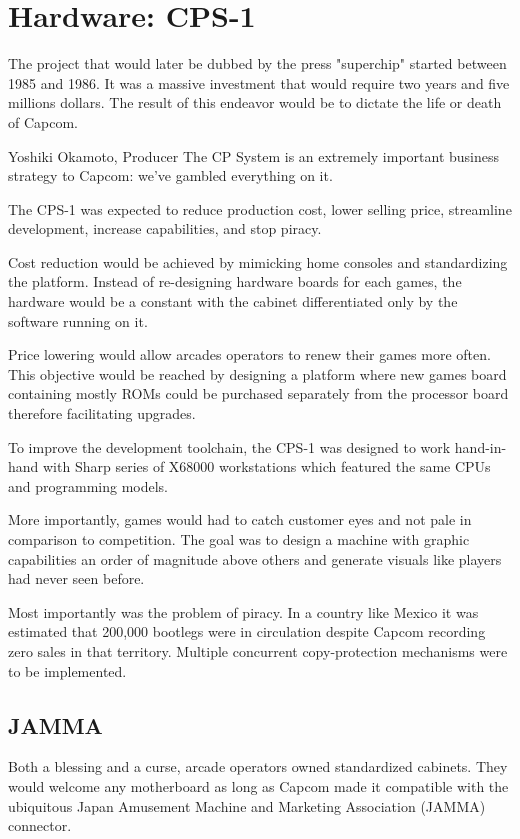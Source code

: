 \chapter{Hardware: CPS-1}

The project that would later be dubbed by the press "superchip"\cite{tgm198906} started between 1985 and 1986. It was a massive investment that would require two years and five millions dollars. The result of this endeavor would be to dictate the life or death of Capcom.

\begin{q}{Yoshiki Okamoto, Producer\cite{gamest38}}
The CP System is an extremely important business strategy to Capcom: we’ve gambled everything on it.
\end{q}

The CPS-1 was expected to reduce production cost, lower selling price, streamline development, increase capabilities, and stop piracy. 

Cost reduction would be achieved by mimicking home consoles and standardizing the platform. Instead of re-designing hardware boards for each games, the hardware would be a constant with the cabinet differentiated only by the software running on it.

Price lowering would allow arcades operators to renew their games more often. This objective would be reached by designing a platform where new games board containing mostly ROMs could be purchased separately from the processor board therefore facilitating upgrades.

To improve the development toolchain, the CPS-1 was designed to work hand-in-hand with Sharp series of X68000 workstations which featured the same CPUs and programming models.

More importantly, games would had to catch customer eyes and not pale in comparison to competition. The goal was to design a machine with graphic capabilities an order of magnitude above others and generate visuals like players had never seen before.

Most importantly was the problem of piracy. In a country like Mexico it was estimated that 200,000 bootlegs were in circulation\cite{sf2_oral_history} despite Capcom recording zero sales in that territory. Multiple concurrent copy-protection mechanisms were to be implemented.


\section{JAMMA}
Both a blessing and a curse, arcade operators owned  standardized cabinets. They would welcome any motherboard as long as Capcom made it compatible with the ubiquitous Japan Amusement Machine and Marketing Association (JAMMA) connector. 

